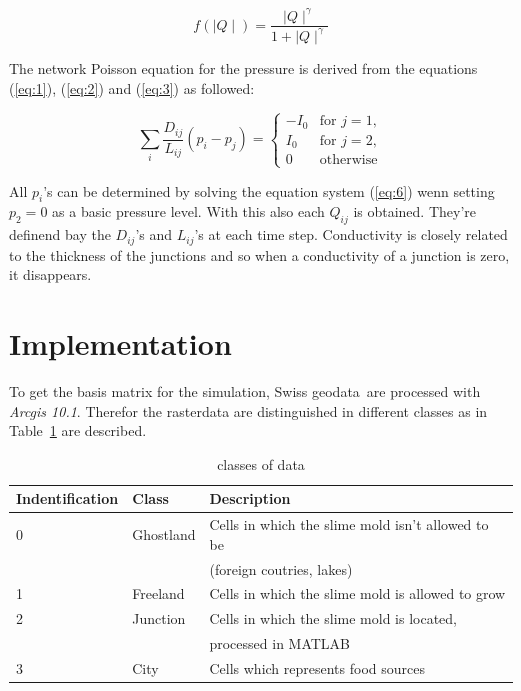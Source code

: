 \documentclass[11pt]{scrartcl}
\begin{document}
\begin{equation}
	\label{eq:5}
	f\left(\mid Q \mid \right)=\frac{\mid Q \mid^\gamma }{1+\mid Q \mid^\gamma}
\end{equation}

The network Poisson equation for the pressure is derived from the equations (\ref{eq:1}), (\ref{eq:2}) and (\ref{eq:3}) as followed:

\begin{equation}
	\label{eq:6}
	\sum_{i} \frac{D_{ij}}{L_{ij}}\left(p_i-p_j\right)= \begin{cases}
										-I_0 & \mathrm{for}\,\, j=1,\\
										I_0 & \mathrm{for} \,\,j=2,\\
										0 & \mathrm{otherwise}
										\end{cases}
\end{equation}

All $p_i$'s can be determined by solving the equation system (\ref{eq:6}) wenn setting $p_2=0$ as a basic pressure level. With this also each $Q_{ij}$ is obtained. They're definend bay the $D_{ij}$'s and $L_{ij}$'s  at each time step. Conductivity is closely related to the thickness of the junctions and so when a conductivity of a junction is zero, it disappears.

\section{Implementation}

To get the basis matrix for the simulation, Swiss geodata\,\cite{gis_data} are processed with \textit{Arcgis 10.1}. Therefor the rasterdata are distinguished in different classes as in Table\, \ref{tab:class} are described.

\begin{table}[H]
	\centering
	\caption{classes of data}
		\begin{tabular}{lll}
		\toprule
		Indentification & Class & Description \\
		\midrule
		0 & Ghostland & Cells in which the slime mold isn't allowed to be\\
		& 		& (foreign coutries, lakes)\\
		1 & Freeland & Cells in which the slime mold is allowed to grow\\
		2 & Junction & Cells in which the slime mold is located, \\
		& & processed in MATLAB\\
		3 & City & Cells which represents food sources\\
		\bottomrule
	\end{tabular}
\label{tab:class}
\end{table}
\end{document}
